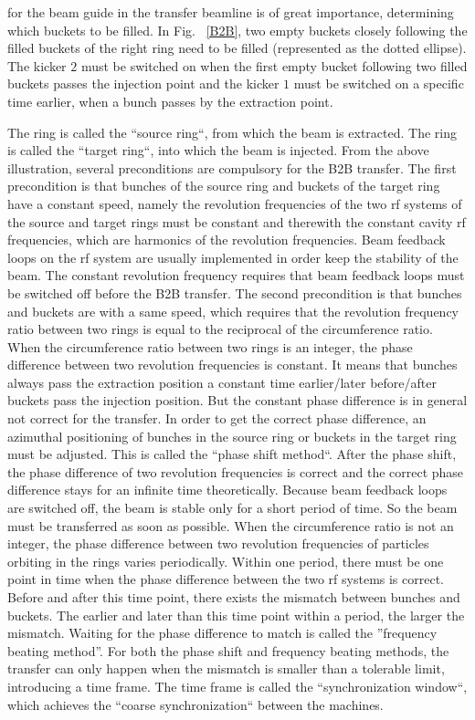 for the beam guide in the transfer beamline is of great importance, determining which buckets to be filled. In Fig. ~\ref{B2B}, two empty buckets closely following the filled buckets of the right ring need to be filled (represented as the dotted ellipse). The kicker $2$ must be switched on when the first empty bucket following two filled buckets passes the injection point and the kicker $1$ must be switched on a specific time earlier, when a bunch passes by the extraction point. 

The ring is called the ``source ring``, from which the beam is extracted. The ring is called the ``target ring``, into which the beam is injected. From the above illustration, several preconditions are compulsory for the B2B transfer. The first precondition is that bunches of the source ring and buckets of the target ring have a constant speed, namely the revolution frequencies of the two rf systems of the source and target rings must be constant and therewith the constant cavity rf frequencies, which are harmonics of the revolution frequencies. Beam feedback loops on the rf system are usually implemented in order keep the stability of the beam. The constant revolution frequency requires that beam feedback loops must be switched off before the B2B transfer. The second precondition is that bunches and buckets are with a same speed, which requires that the revolution frequency ratio between two rings is equal to the reciprocal of the circumference ratio. When the circumference ratio between two rings is an integer, the phase difference between two revolution frequencies is constant. It means that bunches always pass the extraction position a constant time earlier/later before/after buckets pass the injection position. But the constant phase difference is in general not correct for the transfer. In order to get the correct phase difference, an azimuthal positioning of bunches in the source ring or buckets in the target ring must be adjusted. This is called the ``phase shift method``. After the phase shift, the phase difference of two revolution frequencies is correct and the correct phase difference stays for an infinite time theoretically. Because beam feedback loops are switched off, the beam is stable only for a short period of time. So the beam must be transferred as soon as possible. %
When the circumference ratio is not an integer, the phase difference between two revolution frequencies of particles orbiting in the rings varies periodically. Within one period, there must be one point in time when the phase difference between the two rf systems is correct. Before and after this time point, there exists the mismatch between bunches and buckets. The earlier and later than this time point within a period, the larger the mismatch. Waiting for the phase difference to match is called the ''frequency beating method''. For both the phase shift and frequency beating methods, the transfer can only happen when the mismatch is smaller than a tolerable limit, introducing a time frame. The time frame is called the ``synchronization window``, which achieves the ``coarse synchronization`` between the machines.

